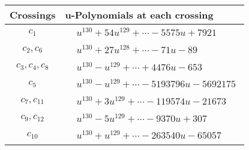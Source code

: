 \documentclass[1p]{elsarticle_modified}
\theoremstyle{definition}
\begin{document}
\begin{tabular}{m{50pt}|m{274pt}}
Crossings & \hspace{64pt}u-Polynomials at each crossing \\
\hline $$\begin{aligned}c_{1}\end{aligned}$$&$\begin{aligned}
&u^{130}+54 u^{129}+\cdots-5575 u+7921
\end{aligned}$\\
\hline $$\begin{aligned}c_{2},c_{6}\end{aligned}$$&$\begin{aligned}
&u^{130}+27 u^{128}+\cdots-71 u-89
\end{aligned}$\\
\hline $$\begin{aligned}c_{3},c_{4},c_{8}\end{aligned}$$&$\begin{aligned}
&u^{130}- u^{129}+\cdots+4476 u-653
\end{aligned}$\\
\hline $$\begin{aligned}c_{5}\end{aligned}$$&$\begin{aligned}
&u^{130}- u^{129}+\cdots-5193796 u-5692175
\end{aligned}$\\
\hline $$\begin{aligned}c_{7},c_{11}\end{aligned}$$&$\begin{aligned}
&u^{130}+3 u^{129}+\cdots-119574 u-21673
\end{aligned}$\\
\hline $$\begin{aligned}c_{9},c_{12}\end{aligned}$$&$\begin{aligned}
&u^{130}-5 u^{129}+\cdots-9370 u+307
\end{aligned}$\\
\hline $$\begin{aligned}c_{10}\end{aligned}$$&$\begin{aligned}
&u^{130}+u^{129}+\cdots-263540 u-65057
\end{aligned}$\\
\hline
\end{tabular}\\~\\
\end{document}
